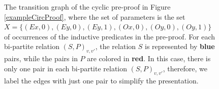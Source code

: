 \begin{figure}[]
\begin{mdframed}
\end{mdframed}

\caption{The transition graph of the cyclic pre-proof in Figure \ref{exampleCircProof}, where the set of parameters is the set $X = \{ (Ex,0), (Ey,0), (Ey,1), (Ox,0), (Oy,0), (Oy,1)\}$ of occurrences of the inductive predicates in the pre-proof. 
For each bi-partite relation
$(S,P)_{v,v'}$, the relation $S$ is represented by {\color{blue} \bf blue} pairs, while the pairs in $P$ are colored in {\color{red} \bf red}. In this case, there is only one pair in each bi-partite relation $(S,P)_{v,v'}$, therefore, we label the edges with just one pair to simplify the presentation.}

\label{exampleTransGraph}
\end{figure}